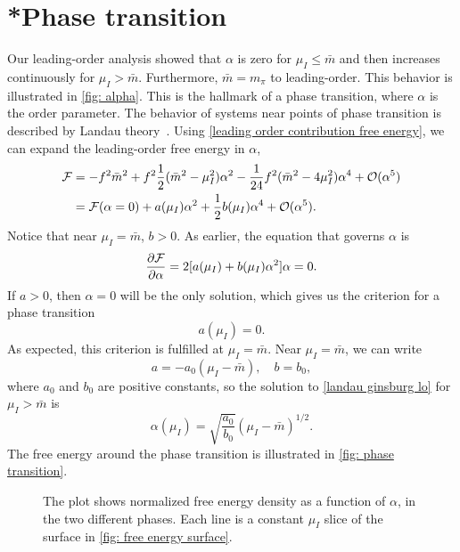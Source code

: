 \section{*Phase transition}
\label{section: phase transition}


Our leading-order analysis showed that $\alpha$ is zero for $\mu_I \leq \bar m$ and then increases continuously for $\mu_I>\bar m$.
Furthermore, $\bar m = m_\pi$ to leading-order.
This behavior is illustrated in \autoref{fig: alpha}.
This is the hallmark of a phase transition, where $\alpha$ is the order parameter.
The behavior of systems near points of phase transition is described by Landau theory~\autocite{peskinIntroductionQuantumField1995}.
Using \autoref{leading order contribution free energy}, we can expand the leading-order free energy in $\alpha$,
%
%
\begin{align}
    \nonumber
    \mathcal{F}
    & = -f^2 \bar m^2 + f^2 \frac{1}{2}(\bar m^2 - \mu_I^2)\alpha^2
    - \frac{1}{24} f^2 (\bar m^2 - 4 \mu_I^2) \alpha^4 + \mathcal O(\alpha^5)\\
    & = \mathcal{F}(\alpha=0) + a(\mu_I)\alpha^2 + \frac{1}{2} b(\mu_I)\alpha^4 + \mathcal O(\alpha^5).
\end{align}
%
Notice that near $\mu_I = \bar m$, $b > 0$.
As earlier, the equation that governs $\alpha$ is
%
\begin{equation}
    \label{landau ginsburg lo}
    \pdv{\mathcal{F}}{\alpha} = 2 [a(\mu_I) + b(\mu_I) \alpha^2] \alpha = 0.
\end{equation}
%
If $a>0$, then $\alpha = 0$ will be the only solution, which gives us the criterion for a phase transition
%
\begin{equation}
    a(\mu_I) = 0.
\end{equation}
%
As expected, this criterion is fulfilled at $\mu_I = \bar m$.
Near $\mu_I = \bar m$, we can write
%
\begin{equation}
    a = - a_0 (\mu_I - \bar m), \quad b = b_0,
\end{equation}
%
where $a_0$ and $b_0$ are positive constants, so the solution to \autoref{landau ginsburg lo} for $\mu_I>\bar m$ is
%
%
\begin{equation}
    \alpha(\mu_I) = \sqrt{\frac{a_0}{b_0}} (\mu_I - \bar m)^{1/2}.
\end{equation}
%
The free energy around the phase transition is illustrated in \autoref{fig: phase transition}.

\begin{figure}[h]
    \centering
    \caption{
        The plot shows normalized free energy density as a function of $\alpha$, in the two different phases. Each line is a constant $\mu_I$ slice of the surface in \autoref{fig: free energy surface}.
        }
    \label{fig: phase transition}
\end{figure}

